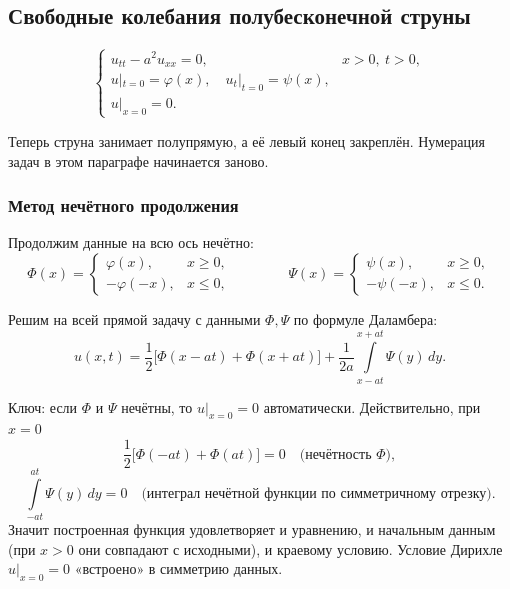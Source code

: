 \subsection{Свободные колебания полубесконечной струны}

\begin{equation}\tag{1}\label{eq:semi-dirichlet}
  \begin{cases}
    u_{tt} - a^2 u_{xx} = 0, & x > 0,\ t > 0, \\[2pt]
    u|_{t=0} = \varphi(x), \quad u_t|_{t=0} = \psi(x), \\[2pt]
    u|_{x=0} = 0 .
  \end{cases}
\end{equation}

Теперь струна занимает полупрямую, а её левый конец закреплён. Нумерация задач в
этом параграфе начинается заново.

\subsubsection*{Метод нечётного продолжения}

Продолжим данные на всю ось нечётно:
\[
  \Phi(x) =
  \begin{cases}
    \varphi(x), & x \ge 0, \\
    -\varphi(-x), & x \le 0,
  \end{cases}
  \qquad\qquad
  \Psi(x) =
  \begin{cases}
    \psi(x), & x \ge 0, \\
    -\psi(-x), & x \le 0 .
  \end{cases}
\]


Решим на всей прямой задачу с данными $\Phi, \Psi$ по формуле Даламбера:
\[
  u(x,t) = \frac12\Big[\Phi(x-at) + \Phi(x+at)\Big]
         + \frac{1}{2a}\int\limits_{x-at}^{x+at} \Psi(y)\, dy .
\]

\begin{idea}
Ключ: если $\Phi$ и $\Psi$ нечётны, то $u|_{x=0} = 0$ автоматически. Действительно,
при $x=0$
\[
  \frac12\big[\Phi(-at) + \Phi(at)\big] = 0
  \quad\text{(нечётность $\Phi$)},
\]
\[
  \int\limits_{-at}^{at} \Psi(y)\, dy = 0
  \quad\text{(интеграл нечётной функции по симметричному отрезку)} .
\]
Значит построенная функция удовлетворяет и уравнению, и начальным данным (при
$x>0$ они совпадают с исходными), и краевому условию. Условие Дирихле
$u|_{x=0}=0$ «встроено» в симметрию данных.
\end{idea}

